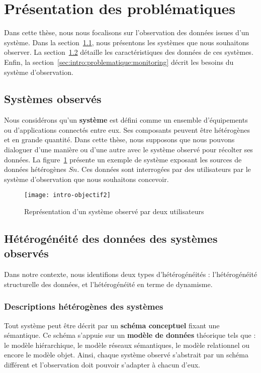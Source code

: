 \section{Présentation des problématiques}\label{sec:intro:problematique}
Dans cette thèse, nous nous focalisons sur l'observation des données issues d'un système. Dans la section~\ref{sec:intro:problematique:system}, nous présentons les systèmes que nous souhaitons observer. La section~\ref{sec:intro:problematique:data} détaille les caractéristiques des données de ces systèmes. Enfin, la section~\ref{sec:intro:problematique:monitoring} décrit les besoins du système d'observation.

\subsection{Systèmes observés}\label{sec:intro:problematique:system}
Nous considérons qu'un \textbf{système} est défini comme un ensemble d'équipements ou d'applications connectés entre eux. Ses composants peuvent être hétérogènes et en grande quantité. Dans cette thèse, nous supposons que nous pouvons dialoguer d'une manière ou d'une autre avec le système observé pour récolter ses données. La figure~\ref{fig:intro:objectif:abstraction} présente un exemple de système exposant les sources de données hétérogènes $Sn$. Ces données sont interrogées par des utilisateurs par le système d'observation que nous souhaitons concevoir.

\begin{figure}[ht]
\centering
\texttt{[image: intro-objectif2]}
\caption{Représentation d'un système observé par deux utilisateurs}\label{fig:intro:objectif:abstraction}
\end{figure}

\subsection{Hétérogénéité des données des systèmes observés}\label{sec:intro:problematique:data}
Dans notre contexte, nous identifions deux types d'hétérogénéités : l'hétérogénéité structurelle des données, et l'hétérogénéité en terme de dynamisme.
\subsubsection{Descriptions hétérogènes des systèmes}
Tout système peut être décrit par un \textbf{schéma conceptuel} fixant une sémantique. Ce schéma s'appuie sur un \textbf{modèle de données} théorique tels que : le modèle hiérarchique, le modèle réseaux sémantiques, le modèle relationnel ou encore le modèle objet. Ainsi, chaque système observé s'abstrait par un schéma différent et l'observation doit pouvoir s'adapter à chacun d'eux.

